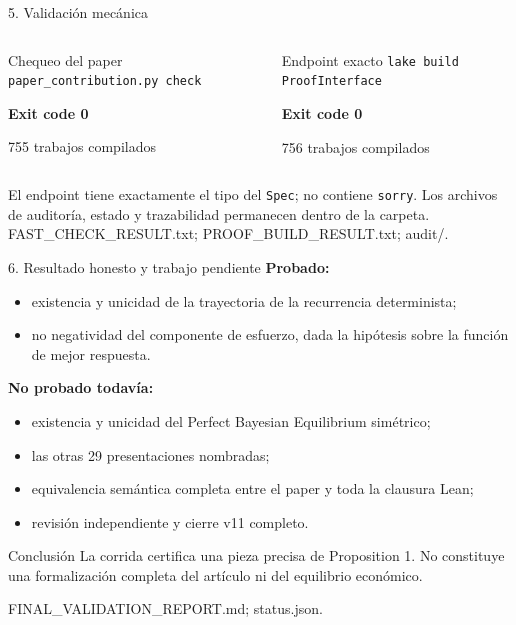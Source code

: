 \documentclass[aspectratio=169,10pt]{beamer}
\newcommand{\src}[1]{\vfill{\tiny\color{gray}#1}}
\begin{document}
\begin{frame}{5. Validación mecánica}
  \begin{columns}[T]
    \begin{block}{Chequeo del paper}
      \centering
      \texttt{paper\_contribution.py check}\par\smallskip
      \Large\textbf{Exit code 0}\par\smallskip
      \normalsize 755 trabajos compilados
    \end{block}
    \begin{block}{Endpoint exacto}
      \centering
      \texttt{lake build ProofInterface}\par\smallskip
      \Large\textbf{Exit code 0}\par\smallskip
      \normalsize 756 trabajos compilados
    \end{block}
  \end{columns}
  \medskip
  El endpoint tiene exactamente el tipo del \texttt{Spec}; no contiene
  \texttt{sorry}. Los archivos de auditoría, estado y trazabilidad permanecen
  dentro de la carpeta.
  \src{FAST\_CHECK\_RESULT.txt; PROOF\_BUILD\_RESULT.txt; audit/.}
\end{frame}

\begin{frame}{6. Resultado honesto y trabajo pendiente}
  \textbf{Probado:}
  \begin{itemize}
    \item existencia y unicidad de la trayectoria de la recurrencia determinista;
    \item no negatividad del componente de esfuerzo, dada la hipótesis sobre
      la función de mejor respuesta.
  \end{itemize}
  \textbf{No probado todavía:}
  \begin{itemize}
    \item existencia y unicidad del Perfect Bayesian Equilibrium simétrico;
    \item las otras 29 presentaciones nombradas;
    \item equivalencia semántica completa entre el paper y toda la clausura Lean;
    \item revisión independiente y cierre v11 completo.
  \end{itemize}
  \begin{alertblock}{Conclusión}
    La corrida certifica una pieza precisa de Proposition 1. No constituye una
    formalización completa del artículo ni del equilibrio económico.
  \end{alertblock}
  \src{FINAL\_VALIDATION\_REPORT.md; status.json.}
\end{frame}
\end{document}
